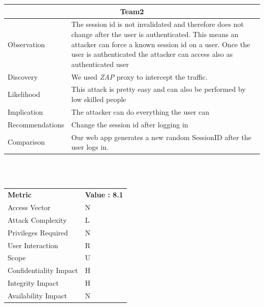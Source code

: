 \documentclass[headsepline,footsepline,footinclude=false,oneside,fontsize=11pt,paper=a4,listof=totoc,bibliography=totoc]{scrbook} %
\begin{document}
\begin{tabular}{ l|p{11cm}  }
	\hline
	\multicolumn{2}{c}{\textbf{Team2}} \\
	\hline
	Observation   & The session id is not invalidated and therefore does not change after the user is authenticated. This means
	an attacker can force a known session id on a user. Once the user is authenticated the attacker can access also as authenticated
	user \\
	Discovery  & We used \textit{ZAP} proxy to intercept the traffic.\\
	Likelihood & This attack is pretty easy and can also be performed by low skilled people\\
	Implication    & The attacker can do everything the user can \\
	Recommendations& Change the session id after logging in \\
	Comparison & Our web app generates a new random SessionID after the user logs in.\\
	\hline
\end{tabular}
\\
\vspace{0.5cm}
\\
\begin{center}
	\begin{tabular}{ll}
		\rowcolor[HTML]{34CDF9}
		{\color[HTML]{ECF4FF} \textbf{Metric}}        & {\color[HTML]{ECF4FF} \textbf{Value : 8.1}} \\
		\rowcolor[HTML]{BBDAFF}
		{\color[HTML]{333333} Access Vector}          & {\color[HTML]{333333} } N             \\
		\rowcolor[HTML]{ECF4FF}
		{\color[HTML]{333333} Attack Complexity}      & {\color[HTML]{333333} } L              \\
		\rowcolor[HTML]{BBDAFF}
		{\color[HTML]{333333} Privileges Required}    & {\color[HTML]{333333} } N              \\
		\rowcolor[HTML]{ECF4FF}
		{\color[HTML]{333333} User Interaction}       & {\color[HTML]{333333} } R              \\
		\rowcolor[HTML]{BBDAFF}
		{\color[HTML]{333333} Scope}                  & {\color[HTML]{333333} } U              \\
		\rowcolor[HTML]{ECF4FF}
		{\color[HTML]{333333} Confidentiality Impact} & {\color[HTML]{333333} } H              \\
		\rowcolor[HTML]{BBDAFF}
		{\color[HTML]{333333} Integrity Impact}       & {\color[HTML]{333333} } H              \\
		\rowcolor[HTML]{ECF4FF}
		{\color[HTML]{333333} Availability Impact}    & {\color[HTML]{333333} } N
	\end{tabular}
\end{center}
\pagebreak
\end{document}
